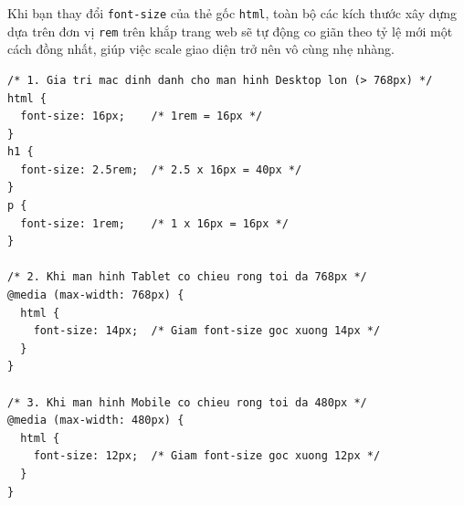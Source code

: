 \documentclass[11pt,oneside]{book}
\newcommand{\thd}[1]{\textcolor{white}{\textbf{\strut #1}}}
\newcommand{\codeinline}[1]{\textcolor{accentOrange}{\texttt{#1}}}
\begin{document}
\begin{noteBox}
Khi bạn thay đổi \codeinline{font-size} của thẻ gốc \codeinline{html}, toàn bộ các kích thước xây dựng dựa trên đơn vị \codeinline{rem} trên khắp trang web sẽ tự động co giãn theo tỷ lệ mới một cách đồng nhất, giúp việc scale giao diện trở nên vô cùng nhẹ nhàng.
\end{noteBox}

\begin{codeWindow}
\begin{lstlisting}[language=CSS3]
/* 1. Gia tri mac dinh danh cho man hinh Desktop lon (> 768px) */
html {
  font-size: 16px;    /* 1rem = 16px */
}
h1 {
  font-size: 2.5rem;  /* 2.5 x 16px = 40px */
}
p {
  font-size: 1rem;    /* 1 x 16px = 16px */
}

/* 2. Khi man hinh Tablet co chieu rong toi da 768px */
@media (max-width: 768px) {
  html {
    font-size: 14px;  /* Giam font-size goc xuong 14px */
  }
}

/* 3. Khi man hinh Mobile co chieu rong toi da 480px */
@media (max-width: 480px) {
  html {
    font-size: 12px;  /* Giam font-size goc xuong 12px */
  }
}
\end{lstlisting}
\end{codeWindow}

\begin{prettyTableBox}
\sffamily\small
{}
\end{prettyTableBox}
\end{document}
